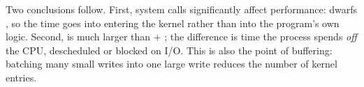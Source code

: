 Two conclusions follow. First, system calls significantly affect performance:  dwarfs , so the time goes into entering the kernel rather than into the program's own logic. Second,  is much larger than  $+$ ; the difference is time the process spends \emph{off} the CPU, descheduled or blocked on I/O. This is also the point of buffering: batching many small writes into one large write reduces the number of kernel entries.

